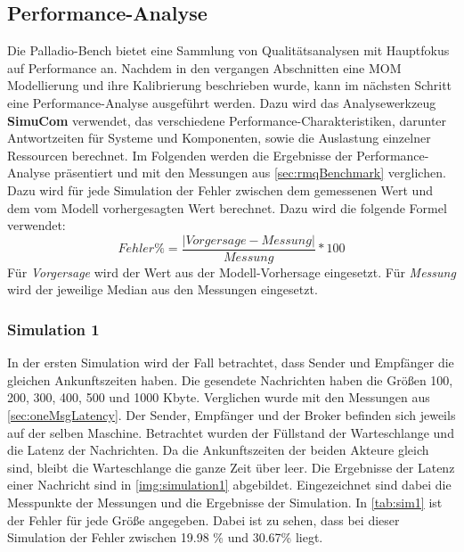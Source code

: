 \subsection{Performance-Analyse}
\label{sec:performanceanalyse}
Die Palladio-Bench bietet eine Sammlung von Qualitätsanalysen mit Hauptfokus auf Performance an. Nachdem in den vergangen Abschnitten eine MOM Modellierung und ihre Kalibrierung beschrieben wurde, kann im nächsten Schritt eine Performance-Analyse ausgeführt werden. Dazu wird das Analysewerkzeug \textbf{SimuCom} verwendet, das verschiedene Performance-Charakteristiken, darunter Antwortzeiten für Systeme und Komponenten, sowie die Auslastung einzelner Ressourcen berechnet. Im Folgenden werden die Ergebnisse der Performance-Analyse präsentiert und mit den Messungen aus \autoref{sec:rmqBenchmark} verglichen. Dazu wird für jede Simulation der Fehler zwischen dem gemessenen Wert und dem vom Modell vorhergesagten Wert berechnet. Dazu wird die folgende Formel verwendet: \[ Fehler\% = \frac{|Vorgersage - Messung|}{Messung} * 100 \] Für \textit{Vorgersage} wird der Wert aus der Modell-Vorhersage eingesetzt. Für \textit{Messung} wird der jeweilige Median aus den Messungen eingesetzt.
\subsubsection{Simulation 1} 
\label{sec:rmqSimulation1}
In der ersten Simulation wird der Fall betrachtet, dass Sender und Empfänger die gleichen Ankunftszeiten haben. Die gesendete Nachrichten haben die Größen 100, 200, 300, 400, 500 und 1000 Kbyte. Verglichen wurde mit den Messungen aus \autoref{sec:oneMsgLatency}. Der Sender, Empfänger und der Broker befinden sich jeweils auf der selben Maschine. Betrachtet wurden der Füllstand der Warteschlange und die Latenz der Nachrichten. 
Da die Ankunftszeiten der beiden Akteure gleich sind, bleibt die Warteschlange die ganze Zeit über leer. Die Ergebnisse der Latenz einer Nachricht sind in \autoref{img:simulation1} abgebildet. Eingezeichnet sind dabei die Messpunkte der Messungen und die Ergebnisse der Simulation. In \autoref{tab:sim1} ist der Fehler für jede Größe angegeben. Dabei ist zu sehen, dass bei dieser Simulation der Fehler zwischen 19.98 \% und 30.67\% liegt.

